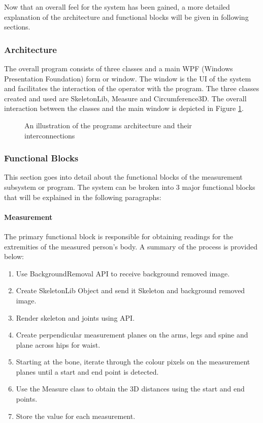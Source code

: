 Now that an overall feel for the system has been gained, a more detailed explanation of the architecture and functional blocks will be given in following sections. 

\subsubsection{Architecture}
The overall program consists of three classes and a main WPF (Windows Presentation Foundation) form or window. The window is the UI of the system and facilitates the interaction of the operator with the program. The three classes created and used are SkeletonLib, Measure and Circumference3D. The overall interaction between the classes and the main window is depicted in Figure \ref{fig:algorithmArchitecture}. 

\begin{figure}[ht]
	\centering
	{%
		\setlength{\fboxsep}{0pt}%
		\setlength{\fboxrule}{0.5pt}%
		}
	\caption{An illustration of the programs architecture and their interconnections}
	\label{fig:algorithmArchitecture}
\end{figure}

\subsubsection{Functional Blocks}
This section goes into detail about the functional blocks of the measurement subsystem or program. The system can be broken into 3 major functional blocks that will be explained in the following paragraphs:

\paragraph{Measurement} The primary functional block is responsible for obtaining readings for the extremities of the measured person's body. A summary of the process is provided below:

\begin{enumerate}
	\item Use BackgroundRemoval API to receive background removed image.
	\item Create SkeletonLib Object and send it Skeleton and background removed image.
	\item Render skeleton and joints using API.
	\item Create perpendicular measurement planes on the arms, legs and spine and plane across hips for waist.
	\item Starting at the bone, iterate through the colour pixels on the measurement planes until a start and end point is detected.
	\item Use the Measure class to obtain the 3D distances using the start and end points.
	\item Store the value for each measurement.
\end{enumerate}

